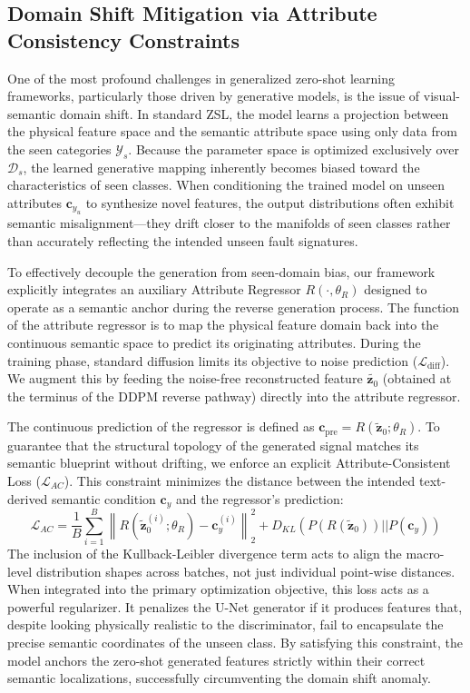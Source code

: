 \subsection{Domain Shift Mitigation via Attribute Consistency Constraints}
\label{subsec:domain_shift}
One of the most profound challenges in generalized zero-shot learning frameworks, particularly those driven by generative models, is the issue of visual-semantic domain shift. In standard ZSL, the model learns a projection between the physical feature space and the semantic attribute space using only data from the seen categories $\mathcal{Y}_s$. Because the parameter space is optimized exclusively over $\mathcal{D}_s$, the learned generative mapping inherently becomes biased toward the characteristics of seen classes. When conditioning the trained model on unseen attributes $\mathbf{c}_{y_u}$ to synthesize novel features, the output distributions often exhibit semantic misalignment---they drift closer to the manifolds of seen classes rather than accurately reflecting the intended unseen fault signatures.

To effectively decouple the generation from seen-domain bias, our framework explicitly integrates an auxiliary Attribute Regressor $R(\cdot, \theta_R)$ designed to operate as a semantic anchor during the reverse generation process. The function of the attribute regressor is to map the physical feature domain back into the continuous semantic space to predict its originating attributes. During the training phase, standard diffusion limits its objective to noise prediction ($\mathcal{L}_{\text{diff}}$). We augment this by feeding the noise-free reconstructed feature $\tilde{\mathbf{z}_0}$ (obtained at the terminus of the DDPM reverse pathway) directly into the attribute regressor.

The continuous prediction of the regressor is defined as $\mathbf{c}_{\text{pre}} = R(\tilde{\mathbf{z}}_0; \theta_R)$. To guarantee that the structural topology of the generated signal matches its semantic blueprint without drifting, we enforce an explicit Attribute-Consistent Loss ($\mathcal{L}_{AC}$). This constraint minimizes the distance between the intended text-derived semantic condition $\mathbf{c}_y$ and the regressor's prediction:
\begin{equation}
\mathcal{L}_{AC} = \frac{1}{B} \sum_{i=1}^{B} \left\| R(\tilde{\mathbf{z}}_{0}^{(i)}; \theta_R) - \mathbf{c}_{y}^{(i)} \right\|_2^2 + D_{KL}(P(R(\tilde{\mathbf{z}}_0)) || P(\mathbf{c}_y))
\end{equation}
The inclusion of the Kullback-Leibler divergence term acts to align the macro-level distribution shapes across batches, not just individual point-wise distances. When integrated into the primary optimization objective, this loss acts as a powerful regularizer. It penalizes the U-Net generator if it produces features that, despite looking physically realistic to the discriminator, fail to encapsulate the precise semantic coordinates of the unseen class. By satisfying this constraint, the model anchors the zero-shot generated features strictly within their correct semantic localizations, successfully circumventing the domain shift anomaly.

